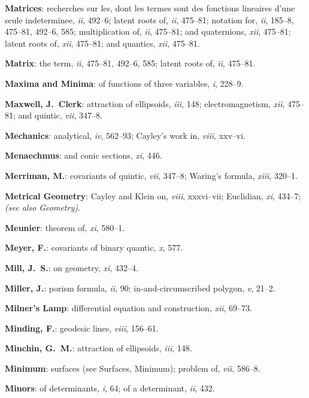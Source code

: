 \documentclass[11pt,a4paper]{article}
\newcommand{\IndexEntry}[1]{\textbf{#1}}
\newcommand{\SeeAlso}[1]{\textit{(see also #1)}}
\newcommand{\V}[1]{\textit{#1}} %
\begin{document}
\IndexEntry{Matrices}: recherches sur les, dont les termes sont des fonctions lineaires d'une seule indeterminee, \V{ii}, 492--6; latent roots of, \V{ii}, 475--81; notation for, \V{ii}, 185--8, 475--81, 492--6, 585; multiplication of, \V{ii}, 475--81; and quaternions, \V{xii}, 475--81; latent roots of, \V{xii}, 475--81; and quantics, \V{xii}, 475--81.

\IndexEntry{Matrix}: the term, \V{ii}, 475--81, 492--6, 585; latent roots of, \V{ii}, 475--81.

\IndexEntry{Maxima and Minima}: of functions of three variables, \V{i}, 228--9.

\IndexEntry{Maxwell, J.\ Clerk}: attraction of ellipsoids, \V{iii}, 148; electromagnetism, \V{xii}, 475--81; and quintic, \V{vii}, 347--8.

\IndexEntry{Mechanics}: analytical, \V{iv}, 562--93; Cayley's work in, \V{viii}, xxv--vi.

\IndexEntry{Menaechmus}: and conic sections, \V{xi}, 446.

\IndexEntry{Merriman, M.}: covariants of quintic, \V{vii}, 347--8; Waring's formula, \V{xiii}, 320--1.

\IndexEntry{Metrical Geometry}: Cayley and Klein on, \V{viii}, xxxvi--vii; Euclidian, \V{xi}, 434--7; \SeeAlso{Geometry}.

\IndexEntry{Meunier}: theorem of, \V{xi}, 580--1.

\IndexEntry{Meyer, F.}: covariants of binary quantic, \V{x}, 577.

\IndexEntry{Mill, J.\ S.}: on geometry, \V{xi}, 432--4.

\IndexEntry{Miller, J.}: porism formula, \V{ii}, 90; in-and-circumscribed polygon, \V{v}, 21--2.

\newpage

\setcounter{page}{112}

\IndexEntry{Milner's Lamp}: differential equation and construction, \V{xii}, 69--73.

\IndexEntry{Minding, F.}: geodesic lines, \V{viii}, 156--61.

\IndexEntry{Minchin, G.\ M.}: attraction of ellipsoids, \V{iii}, 148.

\IndexEntry{Minimum}: surfaces (see Surfaces, Minimum); problem of, \V{vii}, 586--8.

\IndexEntry{Minors}: of determinants, \V{i}, 64; of a determinant, \V{ii}, 432.
\end{document}
